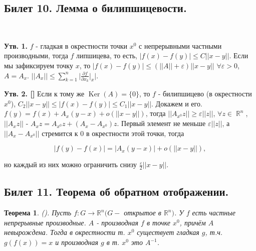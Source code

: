 \documentclass[a4paper]{article}
\theoremstyle{indented}
\newtheorem{theorem}{Теорема}
\theoremstyle{definition}
\theoremstyle{remark}
\DeclareMathOperator{\RR}{\mathbb{R}}
\DeclareMathOperator{\Ker}{Ker}
\begin{document}
\subsection{Билет 10. Лемма о билипшицевости.} \

\textbf{Утв. 1.} $f$ - гладкая в окрестности точки $x^0$ с непрерывными частными производными, тогда $f$ липшицева, то есть, $|f(x)-f(y)|\leq C||x-y||$. Если мы зафиксируем точку $x$, то $|f(x)-f(y)|\leq(||A||+\varepsilon)||x-y||$ $\forall \varepsilon >0$, $A=A_x$. $||A_x||\leq\sum_{k=1}^n\bigg|\frac{\partial f}{\partial x_k}\bigg|_x\bigg|$. \ 

\textbf{Утв. 2. []} Если к тому же $\Ker (A)=\{0\}$, то $f$ - билипшицево (в окрестности $x^0$), $C_2||x-y||\leq |f(x)-f(y)|\leq C_1||x-y||$. Докажем и его. $f(y)= f(x)+A_x(y-x)+o(||x-y||)$, тогда $||A_{x^0}z||\geq \varepsilon ||z||$, $\forall z\in \RR^n$, $||A_xz||$ - $A_xz= A_{x^0}z+(A_x-A_{x^0})z$. Первый элемент не меньше $\varepsilon ||z||$, а $||A_x-A_{x^0}||$ стремится к 0 в окрестности этой точки, тогда 
    
    \[
        |f(y)-f(x)|=|A_x(y-x)|+o(||x-y||),
    \]

но каждый из них можно ограничить снизу $\frac{\varepsilon}{2}||x-y||$. \ 


\subsection{Билет 11. Теорема об обратном отображении.}


\begin{theorem}
    ().
    Пусть $f: G \to \mathbb{R}^n (G -$ открытое в $\mathbb{R}^n)$.
    У $f$ есть частные непрерывные производные. $A$ - производная $f$
    в точке $x^0$, причём $A$ невырождена. Тогда в окрестности т. $x^0$
    существует гладкая $g$, т.ч. $g(f(x))=x$ и производная $g$ в т. $x^0$ это $A^{-1}$. 
\end{theorem}
\end{document}
